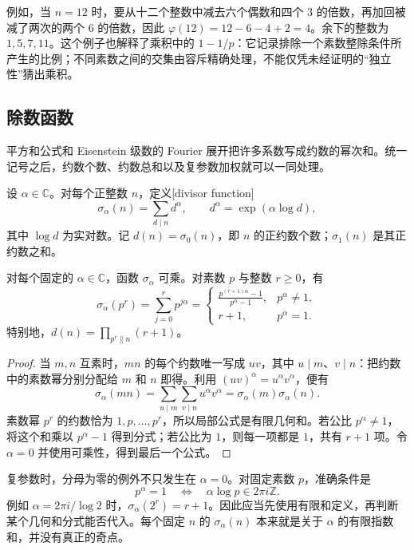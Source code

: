 例如，当 \(n=12\) 时，要从十二个整数中减去六个偶数和四个 \(3\) 的倍数，再加回被减了两次的两个 \(6\) 的倍数，因此 \(\varphi(12)=12-6-4+2=4\)。余下的整数为 \(1,5,7,11\)。这个例子也解释了乘积中的 \(1-1/p\)：它记录排除一个素数整除条件所产生的比例；不同素数之间的交集由容斥精确处理，不能仅凭未经证明的“独立性”猜出乘积。

\subsection{除数函数}
\label{b3:subsec:250105}

平方和公式和 Eisenstein 级数的 Fourier 展开把许多系数写成约数的幂次和。统一记号之后，约数个数、约数总和以及复参数加权就可以一同处理。

\begin{definition}\label{b3:def:25-divisor-functions}
设 \(\alpha\in\mathbb C\)。对每个正整数 \(n\)，定义[divisor function]
\[
 \sigma_\alpha(n)=\sum_{d\mid n}d^\alpha,
 \qquad d^\alpha=\exp(\alpha\log d),
\]
其中 \(\log d\) 为实对数。记 \(d(n)=\sigma_0(n)\)，即 \(n\) 的正约数个数；\(\sigma_1(n)\) 是其正约数之和。
\end{definition}

\begin{proposition}[除数函数的局部公式]
\label{b3:prop:25-divisor-local}
对每个固定的 \(\alpha\in\mathbb C\)，函数 \(\sigma_\alpha\) 可乘。对素数 \(p\) 与整数 \(r\ge0\)，有
\[
 \sigma_\alpha(p^r)=\sum_{j=0}^r p^{j\alpha}
 =\begin{cases}
 \displaystyle\frac{p^{(r+1)\alpha}-1}{p^\alpha-1},&p^\alpha\ne1,\\[6pt]
 r+1,&p^\alpha=1.
 \end{cases}
\]
特别地，\(d(n)=\prod_{p^r\parallel n}(r+1)\)。
\end{proposition}
\begin{proof}
当 \(m,n\) 互素时，\(mn\) 的每个约数唯一写成 \(uv\)，其中 \(u\mid m\)、\(v\mid n\)：把约数中的素数幂分别分配给 \(m\) 和 \(n\) 即得。利用 \((uv)^\alpha=u^\alpha v^\alpha\)，便有
\[
 \sigma_\alpha(mn)
 =\sum_{u\mid m}\sum_{v\mid n}u^\alpha v^\alpha
 =\sigma_\alpha(m)\sigma_\alpha(n).
\]
素数幂 \(p^r\) 的约数恰为 \(1,p,\ldots,p^r\)，所以局部公式是有限几何和。若公比 \(p^\alpha\ne1\)，将这个和乘以 \(p^\alpha-1\) 得到分式；若公比为 \(1\)，则每一项都是 \(1\)，共有 \(r+1\) 项。令 \(\alpha=0\) 并使用可乘性，得到最后一个公式。
\end{proof}

复参数时，分母为零的例外不只发生在 \(\alpha=0\)。对固定素数 \(p\)，准确条件是
\[
 p^\alpha=1
 \quad\Longleftrightarrow\quad
 \alpha\log p\in2\pi i\mathbb Z.
\]
例如 \(\alpha=2\pi i/\log2\) 时，\(\sigma_\alpha(2^r)=r+1\)。因此应当先使用有限和定义，再判断某个几何和分式能否代入。每个固定 \(n\) 的 \(\sigma_\alpha(n)\) 本来就是关于 \(\alpha\) 的有限指数和，并没有真正的奇点。

